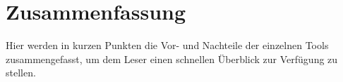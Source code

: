 \section{Zusammenfassung}\label{zusammenfassung}

Hier werden in kurzen Punkten die Vor- und Nachteile der einzelnen Tools zusammengefasst,
um dem Leser einen schnellen Überblick zur Verfügung zu stellen.